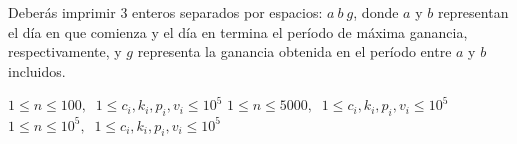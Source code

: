 \documentclass{oci}
\begin{document}
\begin{outputDescription}
Deberás imprimir $3$ enteros separados por espacios: $a \: b \: g$, donde $a$ y $b$ representan el día en que comienza y el día en termina el período de máxima ganancia, respectivamente, y $g$ representa la ganancia obtenida en el período entre $a$ y $b$ incluidos.
\end{outputDescription}

\begin{scoreDescription}
  $1 \leq n \leq 100, \; \; 1 \leq c_i, k_i, p_i, v_i \leq 10^5$ 
  $1 \leq n \leq 5000, \; \; 1 \leq c_i, k_i, p_i, v_i \leq 10^5$ 
  $1 \leq n \leq 10^5, \; \; 1 \leq c_i, k_i, p_i, v_i \leq 10^5$ 
\end{scoreDescription}

\begin{sampleDescription}
\end{sampleDescription}
\end{document}
